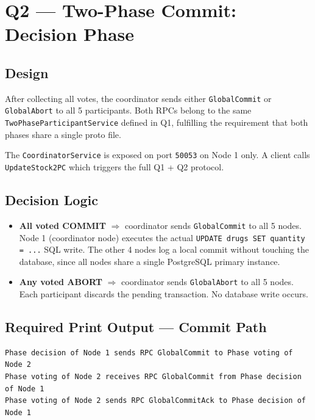\section{Q2 — Two-Phase Commit: Decision Phase}

\subsection*{Design}

After collecting all votes, the coordinator sends either \texttt{GlobalCommit}
or \texttt{GlobalAbort} to all 5 participants. Both RPCs belong to the same
\texttt{TwoPhaseParticipantService} defined in Q1, fulfilling the requirement
that both phases share a single proto file.

The \texttt{CoordinatorService} is exposed on port \texttt{50053} on Node 1 only.
A client calls \texttt{UpdateStock2PC} which triggers the full Q1 + Q2 protocol.

\subsection*{Decision Logic}

\begin{itemize}
  \item \textbf{All voted COMMIT} $\Rightarrow$ coordinator sends \texttt{GlobalCommit} to all 5 nodes.
        Node 1 (coordinator node) executes the actual \texttt{UPDATE drugs SET quantity = ...}
        SQL write. The other 4 nodes log a local commit without touching the database,
        since all nodes share a single PostgreSQL primary instance.
  \item \textbf{Any voted ABORT} $\Rightarrow$ coordinator sends \texttt{GlobalAbort} to all 5 nodes.
        Each participant discards the pending transaction. No database write occurs.
\end{itemize}

\subsection*{Required Print Output — Commit Path}

\begin{lstlisting}[language={}]
Phase decision of Node 1 sends RPC GlobalCommit to Phase voting of Node 2
Phase voting of Node 2 receives RPC GlobalCommit from Phase decision of Node 1
Phase voting of Node 2 sends RPC GlobalCommitAck to Phase decision of Node 1
\end{lstlisting}

